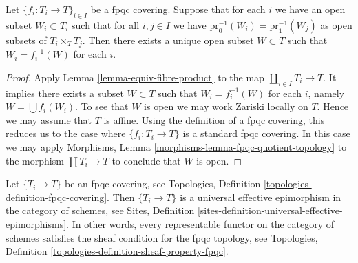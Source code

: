 \begin{lemma}
\label{lemma-open-fpqc-covering}
Let $\{f_i : T_i \to T\}_{i \in I}$ be a fpqc covering.
Suppose that for each $i$ we have an open subset $W_i \subset T_i$
such that for all $i, j \in I$ we have
$\text{pr}_0^{-1}(W_i) = \text{pr}_1^{-1}(W_j)$ as open
subsets of $T_i \times_T T_j$. Then there exists a unique open subset
$W \subset T$ such that $W_i = f_i^{-1}(W)$ for each $i$.
\end{lemma}

\begin{proof}
Apply
Lemma \ref{lemma-equiv-fibre-product}
to the map $\coprod_{i \in I} T_i \to T$.
It implies there exists a subset $W \subset T$ such that
$W_i = f_i^{-1}(W)$ for each $i$, namely $W = \bigcup f_i(W_i)$.
To see that $W$ is open we may work Zariski locally on $T$.
Hence we may assume that $T$ is affine. Using the definition
of a fpqc covering, this reduces us to the case where
$\{f_i : T_i \to T\}$ is a standard fpqc covering. In this case we
may apply
Morphisms, Lemma \ref{morphisms-lemma-fpqc-quotient-topology}
to the morphism
$\coprod T_i \to T$ to conclude that $W$ is open.
\end{proof}

\begin{lemma}
\label{lemma-fpqc-universal-effective-epimorphisms}
Let $\{T_i \to T\}$ be an fpqc covering, see
Topologies, Definition \ref{topologies-definition-fpqc-covering}.
Then $\{T_i \to T\}$ is a universal effective epimorphism
in the category of schemes, see
Sites, Definition \ref{sites-definition-universal-effective-epimorphisms}.
In other words, every representable functor on the category of schemes
satisfies the sheaf condition for the fpqc topology, see
Topologies, Definition \ref{topologies-definition-sheaf-property-fpqc}.
\end{lemma}


